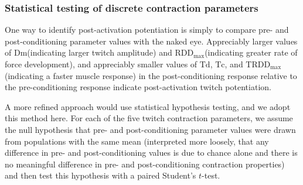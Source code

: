 \documentclass[utf8]{style/FrontiersinHarvard}
\newcommand{\Dm}{\ensuremath{\text{Dm}}\xspace}
\newcommand{\Td}{\ensuremath{\text{Td}}\xspace}
\newcommand{\Tc}{\ensuremath{\text{Tc}}\xspace}
\newcommand{\RDDMax}{\ensuremath{ \text{RDD}_{\text{max}}}\xspace}
\newcommand{\RDDMaxTime}{\ensuremath{ \text{TRDD}_{\text{max}}}\xspace}
\begin{document}
\subsubsection{Statistical testing of discrete contraction parameters} \label{sss:discrete_twitch_param_stats}
One way to identify post-activation potentiation is simply to compare pre- and post-conditioning parameter values with the naked eye.
Appreciably larger values of \Dm (indicating larger twitch amplitude) and \RDDMax (indicating greater rate of force development), and appreciably smaller values of \Td, \Tc, and \RDDMaxTime (indicating a faster muscle response) in the post-conditioning response relative to the pre-conditioning response indicate post-activation twitch potentiation.

A more refined approach would use statistical hypothesis testing, and we adopt this method here.
For each of the five twitch contraction parameters, we assume the null hypothesis that pre- and post-conditioning parameter values were drawn from populations with the same mean
(interpreted more loosely, that any difference in pre- and post-conditioning values is due to chance alone and there is no meaningful difference in pre- and post-conditioning contraction properties)
and then test this hypothesis with a paired Student's $ t $-test.
\end{document}
